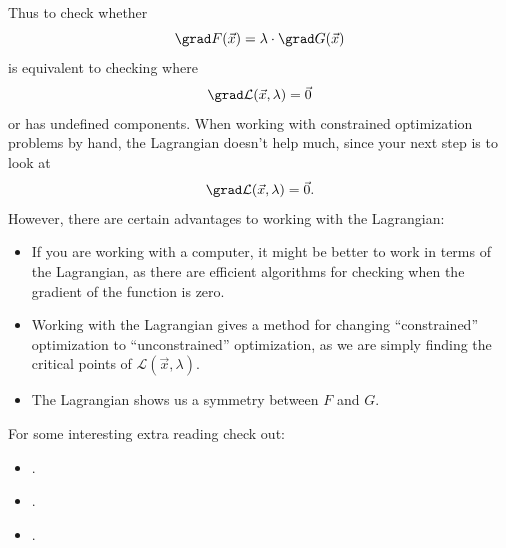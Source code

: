 \documentclass{ximera}
\begin{document}
Thus to check whether
\[
\grad F(\vec{x}) = \lambda \cdot \grad G(\vec{x})
\]
is equivalent to checking where
\[
\grad \mathcal{L}(\vec{x},\lambda) = \vec{0}
\]
or has undefined components. When working with constrained
optimization problems by hand, the Lagrangian doesn't help much, since
your next step is to look at 
\[
\grad \mathcal{L}(\vec{x},\lambda) = \vec{0}.
\]
However, there are certain advantages to working with the Lagrangian:
\begin{itemize}
\item If you are working with a computer, it might be better to work
  in terms of the Lagrangian, as there are efficient algorithms for
  checking when the gradient of the function is zero.
\item Working with the Lagrangian gives a method for changing
  ``constrained'' optimization to ``unconstrained'' optimization, as
  we are simply finding the critical points of
  $\mathcal{L}(\vec{x},\lambda)$.
\item The Lagrangian shows us a symmetry between $F$ and $G$.
\end{itemize}

For some interesting extra reading check out:
\begin{itemize}
\item {}.
\item {}.
\item {}.
\end{itemize}
\end{document}
